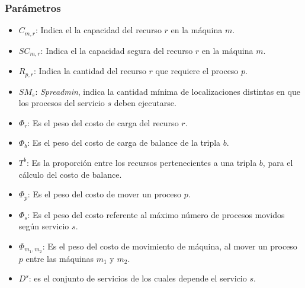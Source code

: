 \documentclass[../informe2.tex]{subfiles}
\begin{document}
\subsubsection{Parámetros}
\begin{itemize}
	\item $C_{m,r}$: Indica el la capacidad del recurso $r$ en la máquina $m$.
	\item $SC_{m,r}$: Indica el la capacidad segura del recurso $r$ en la máquina $m$.
	\item $R_{p,r}$: Indica la cantidad del recurso $r$ que requiere el proceso $p$.
	\item $SM_{s}$: \textit{Spreadmin}, indica la cantidad mínima de localizaciones distintas en que los procesos del servicio $s$ deben ejecutarse.
	\item $\Phi_{r}$: Es el peso del costo de carga del recurso $r$.
	\item $\Phi_{b}$: Es el peso del costo de carga de balance de la tripla $b$.
	\item $T^b$: Es la proporción entre los recursos pertenecientes a una tripla $b$, para el cálculo del costo de balance.
	\item $\Phi_{p}$: Es el peso del costo de mover un proceso $p$.
	\item $\Phi_{s}$: Es el peso del costo referente al máximo número de procesos movidos según servicio $s$.
	\item $\Phi_{m_1,m_2}$: Es el peso del costo de movimiento de máquina, al mover un proceso $p$ entre las máquinas $m_1$ y $m_2$.
	\item $D^s$: es el conjunto de servicios de los cuales depende el servicio $s$.
\end{itemize}
\end{document}
